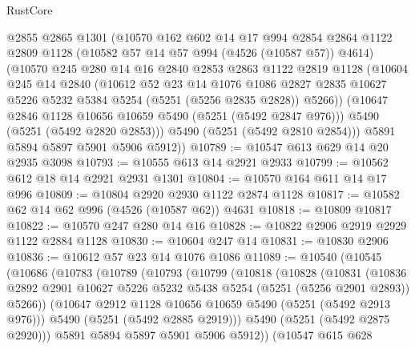 \begin{lexlean}{RustCore}
\begin{coremodule}
        @2855
        @2865
        @1301
        (@10570
          @162
          @602
          @14
          @17
          @994
          @2854
          @2864
          @1122
          @2809
          @1128
          (@10582 @57 @14 @57 @994 (@4526 (@10587 @57)) @4614)
          (@10570
            @245
            @280
            @14
            @16
            @2840
            @2853
            @2863
            @1122
            @2819
            @1128
            (@10604
              @245
              @14
              @2840
              (@10612
                @52
                @23
                @14
                @1076
                @1086
                @2827
                @2835
                @10627
                @5226
                @5232
                @5384
                @5254
                (@5251 (@5256 @2835 @2828))
                @5266))
            (@10647 @2846 @1128 @10656 @10659 @5490 (@5251 (@5492 @2847 @976)))
            @5490
            (@5251 (@5492 @2820 @2853)))
          @5490
          (@5251 (@5492 @2810 @2854)))
        @5891
        @5894
        @5897
        @5901
        @5906
        @5912))
@10789 := @10547 @613 @629 @14 @20 @2935 @3098
@10793 := @10555 @613 @14 @2921 @2933
@10799 := @10562 @612 @18 @14 @2921 @2931 @1301
@10804 := @10570 @164 @611 @14 @17 @996
@10809 := @10804 @2920 @2930 @1122 @2874 @1128
@10817 := @10582 @62 @14 @62 @996 (@4526 (@10587 @62)) @4631
@10818 := @10809 @10817
@10822 := @10570 @247 @280 @14 @16
@10828 := @10822 @2906 @2919 @2929 @1122 @2884 @1128
@10830 := @10604 @247 @14
@10831 := @10830 @2906
@10836 := @10612 @57 @23 @14 @1076 @1086
@11089 := @10540
    (@10545
      (@10686
        (@10783
          (@10789
            (@10793
              (@10799
                (@10818
                  (@10828
                    (@10831
                      (@10836
                        @2892
                        @2901
                        @10627
                        @5226
                        @5232
                        @5438
                        @5254
                        (@5251 (@5256 @2901 @2893))
                        @5266))
                    (@10647 @2912 @1128 @10656 @10659 @5490 (@5251 (@5492 @2913 @976)))
                    @5490
                    (@5251 (@5492 @2885 @2919)))
                  @5490
                  (@5251 (@5492 @2875 @2920)))
                @5891
                @5894
                @5897
                @5901
                @5906
                @5912))
            (@10547
              @615
              @628

\end{coremodule}
\end{lexlean}
